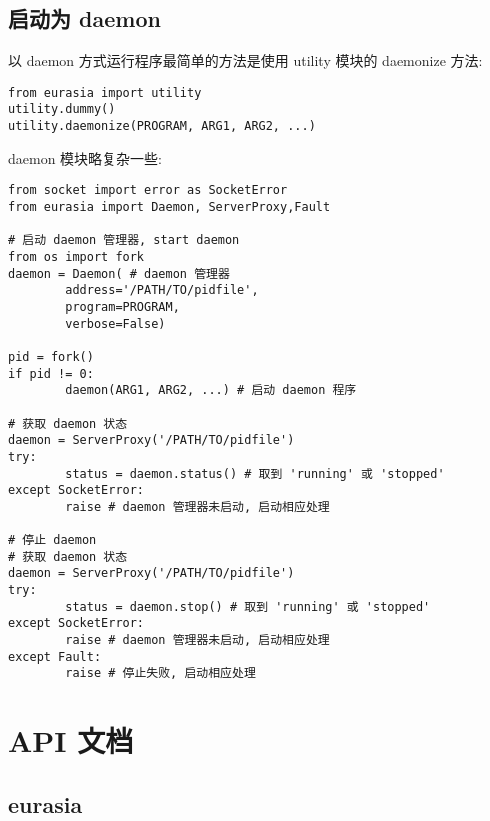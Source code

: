 \documentclass{manual}
\begin{document}

\section{启动为 daemon}

以 daemon 方式运行程序最简单的方法是使用 utility 模块的 daemonize 方法:

\begin{verbatim}
from eurasia import utility
utility.dummy()
utility.daemonize(PROGRAM, ARG1, ARG2, ...)
\end{verbatim}

daemon 模块略复杂一些:

\begin{verbatim}
from socket import error as SocketError
from eurasia import Daemon, ServerProxy,Fault

# 启动 daemon 管理器, start daemon
from os import fork
daemon = Daemon( # daemon 管理器
        address='/PATH/TO/pidfile',
        program=PROGRAM,
        verbose=False)

pid = fork()
if pid != 0:
        daemon(ARG1, ARG2, ...) # 启动 daemon 程序

# 获取 daemon 状态
daemon = ServerProxy('/PATH/TO/pidfile')
try:
        status = daemon.status() # 取到 'running' 或 'stopped'
except SocketError:
        raise # daemon 管理器未启动, 启动相应处理

# 停止 daemon
# 获取 daemon 状态
daemon = ServerProxy('/PATH/TO/pidfile')
try:
        status = daemon.stop() # 取到 'running' 或 'stopped'
except SocketError:
        raise # daemon 管理器未启动, 启动相应处理
except Fault:
        raise # 停止失败, 启动相应处理
\end{verbatim}


\chapter{API 文档}

\section{eurasia}
\end{document}
